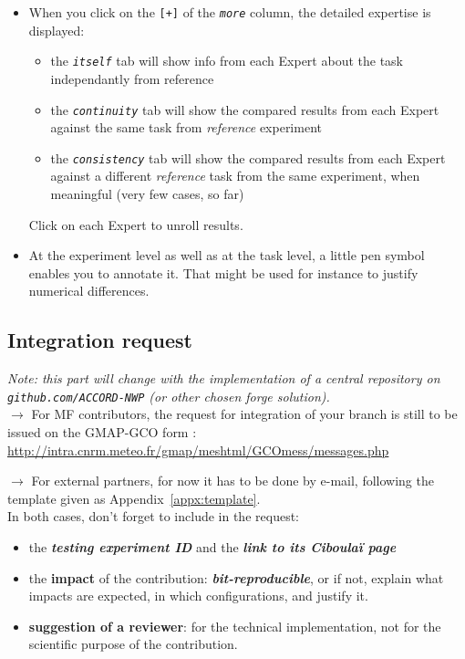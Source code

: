 \documentclass[a4paper,10pt,twoside]{article}
\begin{document}
\begin{itemize}
 \item When you click on the \texttt{[+]} of the \textit{\texttt{more}} column, the detailed expertise is displayed:
 \begin{itemize}
  \item the \textit{\texttt{itself}} tab will show info from each Expert about the task independantly from reference
  \item the \textit{\texttt{continuity}} tab will show the compared results from each Expert against the same task from \textit{reference} experiment
  \item the \textit{\texttt{consistency}} tab will show the compared results from each Expert against a different \textit{reference} task from the same experiment, when meaningful (very few cases, so far)
 \end{itemize}
 Click on each Expert to unroll results.
 \item At the experiment level as well as at the task level, a little pen symbol enables you to annotate it. That might be used for instance to justify numerical differences.
\end{itemize}






\newpage
\subsection{Integration request\label{sect:finalize_submission}}
\textit{Note: this part will change with the implementation of a central repository on \texttt{github.com/ACCORD-NWP} (or other chosen forge solution).}\\

\noindent $\rightarrow$ For MF contributors, the request for integration of your branch is still to be issued on the GMAP-GCO form : \href{http://intra.cnrm.meteo.fr/gmap/meshtml/GCOmess/messages.php}{http://intra.cnrm.meteo.fr/gmap/meshtml/GCOmess/messages.php}

\noindent $\rightarrow$ For external partners, for now it has to be done by e-mail, following the template given as Appendix~\ref{appx:template}.\\ 

\noindent In both cases, don't forget to include in the request:
 \begin{itemize}
  \item the \textit{\textbf{testing experiment ID}} and the \textit{\textbf{link to its Ciboulaï page}}
  \item the \textbf{impact} of the contribution: \textit{\textbf{bit-reproducible}}, or if not, explain what impacts are expected, in which configurations, and justify it.
  \item \textbf{suggestion of a reviewer}: for the technical implementation, not for the scientific purpose of the contribution.
 \end{itemize}
\end{document}
